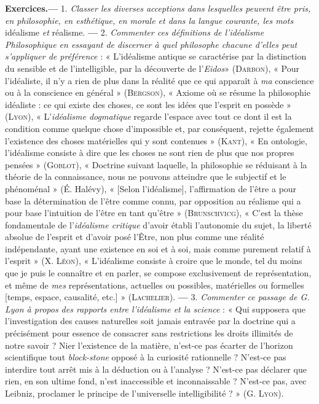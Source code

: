 {\bf Exercices.}{\bf —} 1. {\it Classer les diverses acceptions dans lesquelles peuvent
être pris, en philosophie, en esthétique, en morale et dans la langue courante,
les mots} idéalisme {\it et} réalisme. {\bf —} 2. {\it Commenter ces définitions de l’idéalisme
Philosophique en essayant de discerner à quel philosophe chacune d'elles peut
s'appliquer de préférence} : « L’idéalisme antique se caractérise par la distinction
du sensible et de l’intelligible, par la découverte de l’{\it Eidos}» (\textsc{Darbon}),
« Pour l’idéaliste, il n’y a rien de plus dans la réalité que ce qui apparaît à {\it ma}
conscience ou à la conscience en général » (\textsc{Bergson}), « Axiome où se résume
la philosophie idéaliste : ce qui existe des choses, ce sont les idées que
l'esprit en possède » (\textsc{Lyon}), « L'{\it idéalisme dogmatique} regarde l'espace avec
tout ce dont il est la condition comme quelque chose d'impossible et, par
conséquent, rejette également l'existence des choses matérielles qui y
sont contenues » (\textsc{Kant}), « En ontologie, l’idéalisme consiste à dire que les
choses ne sont rien de plus que nos propres pensées » (\textsc{Goblot}), « Doctrine
suivant laquelle, la philosophie se réduisant à la théorie de la connaissance,
nous ne pouvons atteindre que le subjectif et le phénoménal » (É. Halévy),
« [Selon l’idéalisme], l'affirmation de l'être a pour base la détermination de
l'être comme connu, par opposition au réalisme qui a pour base l'intuition
de l'être en tant qu'être » (\textsc{Brunschvicg}), « C’est la thèse fondamentale
de l’{\it idéalisme critique} d’avoir établi l'autonomie du sujet, la liberté absolue
de l'esprit et d’avoir posé l’Être, non plus comme une réalité indépendante,
ayant une existence en soi et à soi, mais comme purement relatif à l'esprit »
(X. \textsc{Léon}), « L'idéalisme consiste à croire que le monde, tel du moins que
je puis le connaître et en parler, se compose exclusivement de représentation,
et même de {\it mes} représentations, actuelles ou possibles, matérielles ou
formelles [temps, espace, causalité, etc.] » (\textsc{Lachelier}). {\bf —} 3. {\it Commenter
ce passage de G. Lyon à propos des rapports entre l'idéalisme et la science} :
« Qui supposera que l’investigation des causes naturelles soit jamais entravée
par la doctrine qui a précisément pour essence de consacrer sans restrictions
les droits illimités de notre savoir ? Nier l'existence de la matière,
n'est-ce pas écarter de l’horizon scientifique tout {\it block-stone} opposé à la
curiosité rationnelle ? N'est-ce pas interdire tout arrêt mis à la déduction
ou à l'analyse ? N'est-ce pas déclarer que rien, en son ultime fond, n’est
inaccessible et inconnaissable ? N'est-ce pas, avec Leibniz, proclamer le
principe de l’universelle intelligibilité ? » (G. \textsc{Lyon}).

